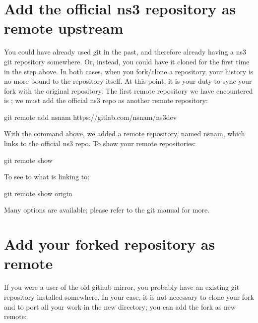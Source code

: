 \documentclass[letterpaper,10pt,english]{sphinxmanual}
\renewcommand{\sphinxcode}[1]{\texttt{\small{#1}}}
\begin{document}
\section{Add the official ns\sphinxhyphen{}3 repository as remote upstream}
\label{\detokenize{working-with-git:add-the-official-ns-3-repository-as-remote-upstream}}
You could have already used git in the past, and therefore already having a ns\sphinxhyphen{}3 git repository somewhere. Or, instead, you could have it cloned for the first time in the step above. In both cases, when you fork/clone a repository, your history is no more bound to the repository itself. At this point, it is your duty to sync your fork with the original repository. The first remote repository we have encountered is \sphinxcode{}; we must add the official ns\sphinxhyphen{}3 repo as another remote repository:

\begin{sphinxVerbatim}[commandchars=\\\{\}]
\PYGZdl{} git remote add nsnam https://gitlab.com/nsnam/ns\PYGZhy{}3\PYGZhy{}dev
\end{sphinxVerbatim}

With the command above, we added a remote repository, named nsnam, which links to the official ns\sphinxhyphen{}3 repo. To show your remote repositories:

\begin{sphinxVerbatim}[commandchars=\\\{\}]
\PYGZdl{} git remote show
\end{sphinxVerbatim}

To see to what \sphinxcode{} is linking to:

\begin{sphinxVerbatim}[commandchars=\\\{\}]
\PYGZdl{} git remote show origin
\end{sphinxVerbatim}

Many options are available; please refer to the git manual for more.


\section{Add your forked repository as remote}
\label{\detokenize{working-with-git:add-your-forked-repository-as-remote}}
If you were a user of the old github mirror, you probably have an existing git repository installed somewhere. In your case, it is not necessary to clone your fork and to port all your work in the new directory; you can add the fork as new remote:
\end{document}
